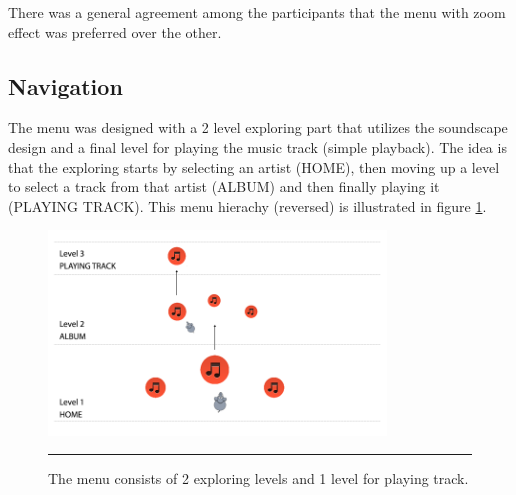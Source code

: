 There was a general agreement among the participants that the menu with zoom effect was preferred over the other.

\subsection{Navigation}
\label{sec:designnavigation}
The menu was designed with a 2 level exploring part that utilizes the soundscape design and a final level for playing the music track (simple playback). The idea is that the exploring starts by selecting an artist (HOME), then moving up a level to select a track from that artist (ALBUM) and then finally playing it (PLAYING TRACK). This menu hierachy (reversed) is illustrated in figure \ref{fig:navigation}.

\begin{figure}[b]
	\centering
		\includegraphics[width=0.8\textwidth,height=\textheight,keepaspectratio]{./Figures/navigation.png}
		\rule{35em}{0.5pt}
	\caption[Menu Hierachy]{The menu consists of 2 exploring levels and 1 level for playing track.}
	\label{fig:navigation}
\end{figure}

